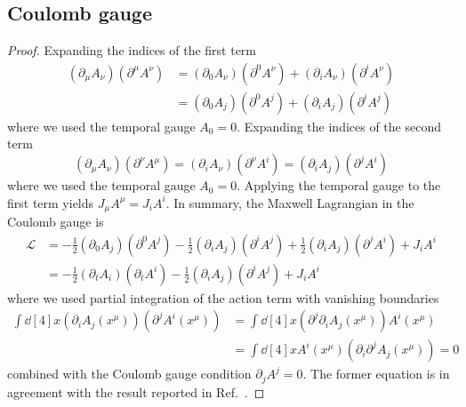 \subsection{Coulomb gauge}

\mwcoulomblagrangian
\begin{proof}
	Expanding the indices of the first term
	\begin{equation*}
		\begin{split}
			\left(\partial_\mu A_\nu\right)
			\left(\partial^\mu A^\nu\right)
			&=
			\left(\partial_0 A_\nu\right)
			\left(\partial^0 A^\nu\right)
			+
			\left(\partial_i A_\nu\right)
			\left(\partial^i A^\nu\right)
			\\
			&=
			\left(\partial_0 A_j\right)
			\left(\partial^0 A^j\right)
			+
			\left(\partial_i A_j\right)
			\left(\partial^i A^j\right)
		\end{split}
	\end{equation*}
	where we used the temporal gauge $A_0=0$.
	Expanding the indices of the second term
	\begin{equation*}
		\left(\partial_\mu A_\nu\right)
		\left(\partial^\nu A^\mu\right)
		=
		\left(\partial_i A_\nu\right)
		\left(\partial^\nu A^i\right)
		=
		\left(\partial_i A_j\right)
		\left(\partial^j A^i\right)
	\end{equation*}
	where we used the temporal gauge $A_0=0$.
	Applying the temporal gauge to the first term yields $J_\mu A^\mu=J_i A^i$.
	In summary, the Maxwell Lagrangian in the Coulomb gauge is
	\begin{equation*}
		\begin{split}
			\mathcal{L}
			&=
			-
			\frac{1}{2}
			\left(\partial_0 A_j\right)
			\left(\partial^0 A^j\right)
			-
			\frac{1}{2}
			\left(\partial_i A_j\right)
			\left(\partial^i A^j\right)
			+
			\frac{1}{2}
			\left(\partial_i A_j\right)
			\left(\partial^j A^i\right)
			+
			J_i A^i
			\\
			&=
			-
			\frac{1}{2}
			\left(\partial_t A_i\right)
			\left(\partial_t A^i\right)
			-
			\frac{1}{2}
			\left(\partial_i A_j\right)
			\left(\partial^i A^j\right)
			+
			J_i A^i
		\end{split}
	\end{equation*}
	where we used partial integration of the action term with vanishing boundaries
	\begin{equation*}
		\begin{split}
			\int\dd[4]{x}
			\left(\partial_i A_j(x^\mu)\right)
			\left(\partial^j A^i(x^\mu)\right)
			&=
			\int\dd[4]{x}
			\left(\partial^j\partial_i A_j(x^\mu)\right)
			A^i(x^\mu)
			\\
			&=
			\int\dd[4]{x}
			A^i(x^\mu)
			\left(\partial_i\partial^jA_j(x^\mu)\right)
			=
			0
		\end{split}
	\end{equation*}
	combined with the Coulomb gauge condition $\partial_j A^j=0$.
	The former equation is in agreement with the result reported in Ref.~\cite[p.~340]{Srednicki2007}.
\end{proof}

